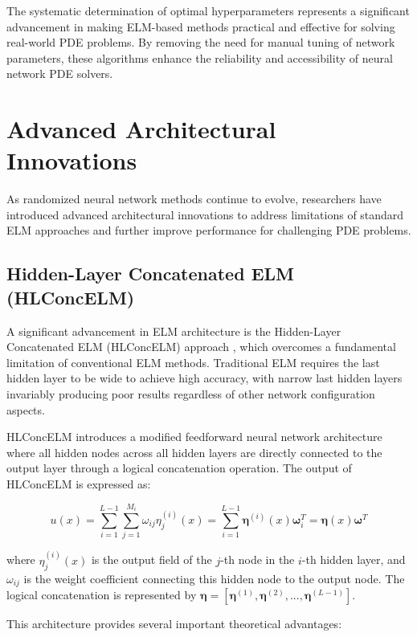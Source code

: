 \documentclass[11pt]{article}
\begin{document}
The systematic determination of optimal hyperparameters represents a significant advancement in making ELM-based methods practical and effective for solving real-world PDE problems. By removing the need for manual tuning of network parameters, these algorithms enhance the reliability and accessibility of neural network PDE solvers.

\section{Advanced Architectural Innovations}

As randomized neural network methods continue to evolve, researchers have introduced advanced architectural innovations to address limitations of standard ELM approaches and further improve performance for challenging PDE problems.

\subsection{Hidden-Layer Concatenated ELM (HLConcELM)}

A significant advancement in ELM architecture is the Hidden-Layer Concatenated ELM (HLConcELM) approach \citep{Ni2022}, which overcomes a fundamental limitation of conventional ELM methods. Traditional ELM requires the last hidden layer to be wide to achieve high accuracy, with narrow last hidden layers invariably producing poor results regardless of other network configuration aspects.

HLConcELM introduces a modified feedforward neural network architecture where all hidden nodes across all hidden layers are directly connected to the output layer through a logical concatenation operation. The output of HLConcELM is expressed as:

\begin{equation}
u(x) = \sum_{i=1}^{L-1} \sum_{j=1}^{M_i} \omega_{ij} \eta_j^{(i)}(x) = \sum_{i=1}^{L-1} \boldsymbol{\eta}^{(i)}(x)\boldsymbol{\omega}_i^T = \boldsymbol{\eta}(x)\boldsymbol{\omega}^T
\end{equation}

where $\eta_j^{(i)}(x)$ is the output field of the $j$-th node in the $i$-th hidden layer, and $\omega_{ij}$ is the weight coefficient connecting this hidden node to the output node. The logical concatenation is represented by $\boldsymbol{\eta} = [\boldsymbol{\eta}^{(1)}, \boldsymbol{\eta}^{(2)}, ..., \boldsymbol{\eta}^{(L-1)}]$.

This architecture provides several important theoretical advantages:
\end{document}
